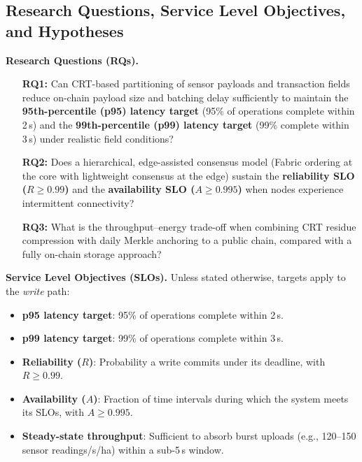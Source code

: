 \documentclass[12pt,onecolumn]{IEEEtran} %
\begin{document}
\subsection{Research Questions, Service Level Objectives, and Hypotheses}
\label{sec:rqs-slos}

\textbf{Research Questions (RQs).}
\begin{enumerate}
    \item[\textbf{RQ1:}] Can CRT-based partitioning of sensor payloads and transaction fields reduce on-chain payload size and batching delay sufficiently to maintain the \textbf{95th-percentile (p95) latency target} (95\% of operations complete within 2\,s) and the \textbf{99th-percentile (p99) latency target} (99\% complete within 3\,s) under realistic field conditions?
    \item[\textbf{RQ2:}] Does a hierarchical, edge-assisted consensus model (Fabric ordering at the core with lightweight consensus at the edge) sustain the \textbf{reliability SLO ($R \geq 0.99$)} and the \textbf{availability SLO ($A \geq 0.995$)} when nodes experience intermittent connectivity?
    \item[\textbf{RQ3:}] What is the throughput–energy trade-off when combining CRT residue compression with daily Merkle anchoring to a public chain, compared with a fully on-chain storage approach?
\end{enumerate}

\textbf{Service Level Objectives (SLOs).}
Unless stated otherwise, targets apply to the \emph{write} path:
\begin{itemize}
    \item \textbf{p95 latency target}: 95\% of operations complete within 2\,s.
    \item \textbf{p99 latency target}: 99\% of operations complete within 3\,s.
    \item \textbf{Reliability ($R$)}: Probability a write commits under its deadline, with $R \geq 0.99$.
    \item \textbf{Availability ($A$)}: Fraction of time intervals during which the system meets its SLOs, with $A \geq 0.995$.
    \item \textbf{Steady-state throughput}: Sufficient to absorb burst uploads (e.g., 120–150 sensor readings/s/ha) within a sub-5\,s window.
\end{itemize}
\end{document}
